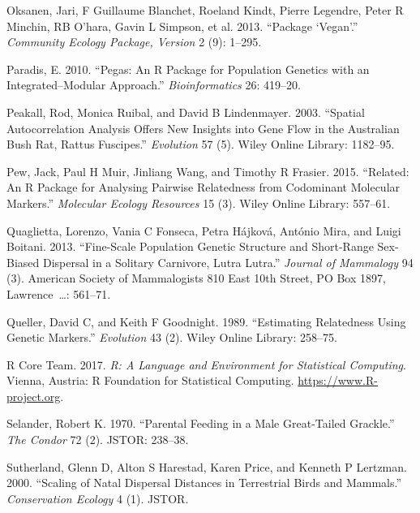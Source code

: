 \documentclass[]{article}
\begin{document}
\leavevmode\hypertarget{ref-oksanen2013package}{}%
Oksanen, Jari, F Guillaume Blanchet, Roeland Kindt, Pierre Legendre,
Peter R Minchin, RB O'hara, Gavin L Simpson, et al. 2013. ``Package
`Vegan'.'' \emph{Community Ecology Package, Version} 2 (9): 1--295.

\leavevmode\hypertarget{ref-Paradis2010pegas}{}%
Paradis, E. 2010. ``Pegas: An R Package for Population Genetics with an
Integrated--Modular Approach.'' \emph{Bioinformatics} 26: 419--20.

\leavevmode\hypertarget{ref-peakall2003spatial}{}%
Peakall, Rod, Monica Ruibal, and David B Lindenmayer. 2003. ``Spatial
Autocorrelation Analysis Offers New Insights into Gene Flow in the
Australian Bush Rat, Rattus Fuscipes.'' \emph{Evolution} 57 (5). Wiley
Online Library: 1182--95.

\leavevmode\hypertarget{ref-pew2015related}{}%
Pew, Jack, Paul H Muir, Jinliang Wang, and Timothy R Frasier. 2015.
``Related: An R Package for Analysing Pairwise Relatedness from
Codominant Molecular Markers.'' \emph{Molecular Ecology Resources} 15
(3). Wiley Online Library: 557--61.

\leavevmode\hypertarget{ref-quaglietta2013fine}{}%
Quaglietta, Lorenzo, Vania C Fonseca, Petra Hájková, António Mira, and
Luigi Boitani. 2013. ``Fine-Scale Population Genetic Structure and
Short-Range Sex-Biased Dispersal in a Solitary Carnivore, Lutra Lutra.''
\emph{Journal of Mammalogy} 94 (3). American Society of Mammalogists 810
East 10th Street, PO Box 1897, Lawrence~\ldots{}: 561--71.

\leavevmode\hypertarget{ref-queller1989estimating}{}%
Queller, David C, and Keith F Goodnight. 1989. ``Estimating Relatedness
Using Genetic Markers.'' \emph{Evolution} 43 (2). Wiley Online Library:
258--75.

\leavevmode\hypertarget{ref-rcoreteam}{}%
R Core Team. 2017. \emph{R: A Language and Environment for Statistical
Computing}. Vienna, Austria: R Foundation for Statistical Computing.
\url{https://www.R-project.org}.

\leavevmode\hypertarget{ref-selander1970parental}{}%
Selander, Robert K. 1970. ``Parental Feeding in a Male Great-Tailed
Grackle.'' \emph{The Condor} 72 (2). JSTOR: 238--38.

\leavevmode\hypertarget{ref-sutherland2000scaling}{}%
Sutherland, Glenn D, Alton S Harestad, Karen Price, and Kenneth P
Lertzman. 2000. ``Scaling of Natal Dispersal Distances in Terrestrial
Birds and Mammals.'' \emph{Conservation Ecology} 4 (1). JSTOR.
\end{document}
